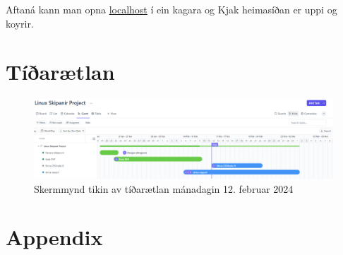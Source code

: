 \documentclass{article}
\begin{document}
 Aftaná kann man opna \underline{localhost} í ein kagara og Kjak heimasíðan er uppi
 og koyrir.

\section{Tíðarætlan}
\begin{figure}[H]
    \includegraphics[width=\linewidth]{tíðarætlan.png}
    \caption{Skermmynd tikin av tíðarætlan mánadagin 12. februar 2024}
    \label{fig:tíðarætlan.png}
\end{figure}

\section{Appendix}








\end{document}
